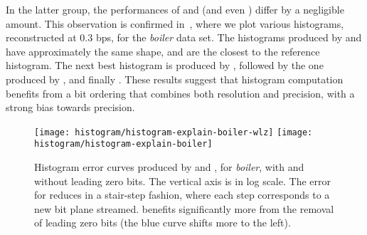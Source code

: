 In the latter group, the performances of \swav and \shsg (and even \shop) differ by a negligible
amount. This observation is confirmed in~, where we plot various
histograms, reconstructed at 0.3 bps, for the \emph{boiler} data set. The histograms produced by
\swav and \shsg have approximately the same shape, and are the closest to the reference histogram.
The next best histogram is produced by \slvl, followed by the one produced by \sbit, and finally
\smag. These results suggest that histogram computation benefits from a bit ordering that combines
both resolution and precision, with a strong bias towards precision.

\begin{figure}[h]
	\centering
	{\texttt{[image: histogram/histogram-explain-boiler-wlz]}}
	{\texttt{[image: histogram/histogram-explain-boiler]}} \caption{Histogram
	error curves produced by \sbit and \slvl, for \emph{boiler}, with and without leading zero bits.
	The vertical axis is in log scale. The error for \sbit reduces in a stair-step fashion, where
	each step corresponds to a new bit plane streamed. \sbit benefits significantly more from the
	removal of leading zero bits (the blue curve shifts more to the left).}
	\label{fig:histogram-explain}
	\vspace{-1em}
\end{figure}
